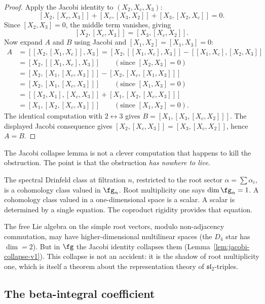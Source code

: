 \begin{proof}
Apply the Jacobi identity to $(X_2,X_c,X_3)$:
\[
[X_2,[X_c,X_3]]+[X_c,[X_3,X_2]]+[X_3,[X_2,X_c]]=0.
\]
Since $[X_2,X_3]=0$, the middle term vanishes, giving
\begin{equation}\label{eq:jacobi-star-v1}
[X_2,[X_c,X_3]]=[X_3,[X_c,X_2]].
\end{equation}
Now expand $A$ and $B$ using Jacobi and $[X_1,X_2]=[X_1,X_3]=0$:
\begin{align*}
A &= [[X_2,[X_1,X_c]],X_3]
 = [X_2,[[X_1,X_c],X_3]] - [[X_1,X_c],[X_2,X_3]]\\
 &= [X_2,[[X_1,X_c],X_3]]
 \qquad(\text{since }[X_2,X_3]=0)\\
 &= [X_2,[X_1,[X_c,X_3]]] - [X_2,[X_c,[X_1,X_3]]]\\
 &= [X_2,[X_1,[X_c,X_3]]]
 \qquad(\text{since }[X_1,X_3]=0)\\
 &= [[X_2,X_1],[X_c,X_3]] + [X_1,[X_2,[X_c,X_3]]]\\
 &= [X_1,[X_2,[X_c,X_3]]]
 \qquad(\text{since }[X_1,X_2]=0).
\end{align*}
The identical computation with $2\leftrightarrow 3$ gives
$B=[X_1,[X_3,[X_c,X_2]]]$. The displayed Jacobi consequence gives
$[X_2,[X_c,X_3]]=[X_3,[X_c,X_2]]$, hence $A=B$.
\end{proof}

\begin{remark}
The Jacobi collapse lemma is not a clever computation that
happens to kill the obstruction. The point is that the obstruction
\emph{has nowhere to live}.

The spectral Drinfeld class at filtration $n$, restricted to the root
sector $\alpha=\sum\alpha_i$, is a cohomology class valued in
$\fg_\alpha$. Root multiplicity one says
$\dim\fg_\alpha=1$. A cohomology class valued in a one-dimensional
space is a scalar. A scalar is determined by a single equation.
The coproduct rigidity provides that equation.

The free Lie algebra on the simple root vectors, modulo non-adjacency
commutation, may have higher-dimensional multilinear spaces (the $D_4$
star has $\dim=2$). But in $\fg$ the Jacobi identity collapses them
(Lemma~\ref{lem:jacobi-collapse-v1}). This collapse is not an accident:
it is the shadow of root multiplicity one, which is itself a theorem
about the representation theory of $\mathfrak{sl}_2$-triples.
\end{remark}

\subsection{The beta-integral coefficient}

